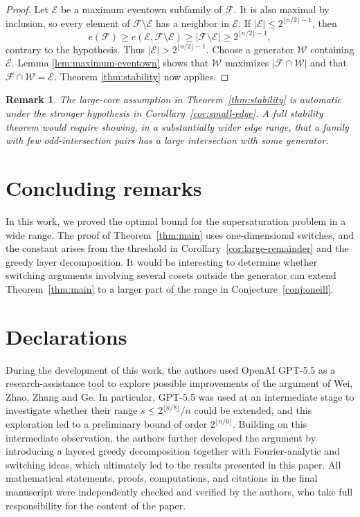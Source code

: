\documentclass[11pt]{article}
\newtheorem{remark}[theorem]{Remark}
\begin{document}
\begin{proof}
Let \(\mathcal E\) be a maximum eventown subfamily of \(\mathcal F\).  It
is also maximal by inclusion, so every element of
\(\mathcal F\setminus\mathcal E\) has a neighbor in \(\mathcal E\).  If
\(|\mathcal E|\le2^{\lfloor n/2\rfloor-1}\), then
\[
 e(\mathcal F)
 \ge
 e(\mathcal E,\mathcal F\setminus\mathcal E)
 \ge
 |\mathcal F\setminus\mathcal E|
 \ge
 2^{\lfloor n/2\rfloor-1},
\]
contrary to the hypothesis.  Thus
\(|\mathcal E|>2^{\lfloor n/2\rfloor-1}\).  Choose a generator
\(\mathcal W\) containing \(\mathcal E\).  Lemma
\ref{lem:maximum-eventown} shows that \(\mathcal W\) maximizes
\(|\mathcal F\cap\mathcal W|\) and that
\(\mathcal F\cap\mathcal W=\mathcal E\).  Theorem
\ref{thm:stability} now applies.
\end{proof}

\begin{remark}
The large-core assumption in Theorem~\ref{thm:stability} is automatic under
the stronger hypothesis in Corollary~\ref{cor:small-edge}.  A full stability
theorem would require showing, in a substantially wider edge range, that a
family with few odd-intersection pairs has a large intersection with some
generator.
\end{remark}

\section{Concluding remarks}\label{sec:conclusion}

In this work, we proved the optimal bound for the supersaturation problem in a wide range. The proof of Theorem~\ref{thm:main} uses one-dimensional switches, and the
constant arises from the threshold in Corollary~\ref{cor:large-remainder} and the greedy layer decomposition. It would be interesting to determine whether
switching arguments involving several cosets outside the generator can extend
Theorem~\ref{thm:main} to a larger part of the range in
Conjecture~\ref{conj:oneill}.

\section*{Declarations}

During the development of this work, the authors used OpenAI GPT-5.5 as a research-assistance tool to explore possible improvements of the argument of Wei, Zhao, Zhang and Ge. In particular, GPT-5.5 was used at an intermediate stage to investigate whether their range \(s\le 2^{\lfloor n/8\rfloor}/n\) could be extended, and this exploration led to a preliminary bound of order \(2^{\lfloor n/6 \rfloor}\). Building on this intermediate observation, the authors further developed the argument by introducing a layered greedy decomposition together with Fourier-analytic and switching ideas, which ultimately led to the results presented in this paper. All mathematical statements, proofs, computations, and citations in the final manuscript were independently checked and verified by the authors, who take full responsibility for the content of the paper.
\end{document}
